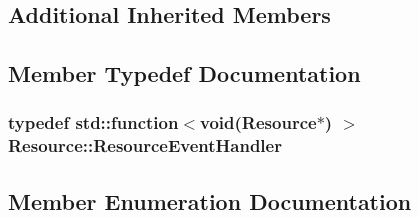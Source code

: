 \subsection*{Additional Inherited Members}


\subsection{Member Typedef Documentation}
\subsubsection[{\texorpdfstring{Resource\+Event\+Handler}{ResourceEventHandler}}]{\setlength{\rightskip}{0pt plus 5cm}typedef std\+::function$<$void({\bf Resource}$\ast$) $>$ {\bf Resource\+::\+Resource\+Event\+Handler}}\hypertarget{class_resource_a3a8c56cef21f639c17ccf95b8b6782e6}{}\label{class_resource_a3a8c56cef21f639c17ccf95b8b6782e6}


\subsection{Member Enumeration Documentation}
